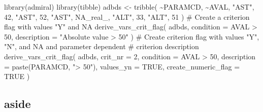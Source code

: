 \documentclass[
]{report}
\newenvironment{Shaded}{\begin{snugshade}}{\end{snugshade}}
\newcommand{\AttributeTok}[1]{\textcolor[rgb]{0.40,0.45,0.13}{#1}}
\newcommand{\CommentTok}[1]{\textcolor[rgb]{0.37,0.37,0.37}{#1}}
\newcommand{\ConstantTok}[1]{\textcolor[rgb]{0.56,0.35,0.01}{#1}}
\newcommand{\DecValTok}[1]{\textcolor[rgb]{0.68,0.00,0.00}{#1}}
\newcommand{\FunctionTok}[1]{\textcolor[rgb]{0.28,0.35,0.67}{#1}}
\newcommand{\NormalTok}[1]{\textcolor[rgb]{0.00,0.23,0.31}{#1}}
\newcommand{\OtherTok}[1]{\textcolor[rgb]{0.00,0.23,0.31}{#1}}
\newcommand{\SpecialCharTok}[1]{\textcolor[rgb]{0.37,0.37,0.37}{#1}}
\newcommand{\StringTok}[1]{\textcolor[rgb]{0.13,0.47,0.30}{#1}}
\begin{document}
\begin{tcolorbox}[enhanced jigsaw, arc=.35mm, bottomrule=.15mm, bottomtitle=1mm, breakable, colback=white, colbacktitle=quarto-callout-tip-color!10!white, colframe=quarto-callout-tip-color-frame, coltitle=black, left=2mm, leftrule=.75mm, opacityback=0, opacitybacktitle=0.6, rightrule=.15mm, title=\textcolor{quarto-callout-tip-color}{\faLightbulb}\hspace{0.5em}{Expand for Full Code Walkthrough}, titlerule=0mm, toprule=.15mm, toptitle=1mm]

\begin{Shaded}
\begin{Highlighting}[]
\FunctionTok{library}\NormalTok{(admiral)}
\FunctionTok{library}\NormalTok{(tibble)}
\NormalTok{adbds }\OtherTok{\textless{}{-}} \FunctionTok{tribble}\NormalTok{(}
  \SpecialCharTok{\textasciitilde{}}\NormalTok{PARAMCD, }\SpecialCharTok{\textasciitilde{}}\NormalTok{AVAL,}
  \StringTok{"AST"}\NormalTok{,    }\DecValTok{42}\NormalTok{,}
  \StringTok{"AST"}\NormalTok{,    }\DecValTok{52}\NormalTok{,}
  \StringTok{"AST"}\NormalTok{,    }\ConstantTok{NA\_real\_}\NormalTok{,}
  \StringTok{"ALT"}\NormalTok{,    }\DecValTok{33}\NormalTok{,}
  \StringTok{"ALT"}\NormalTok{,    }\DecValTok{51}
\NormalTok{)}
\CommentTok{\# Create a criterion flag with values "Y" and NA}
\FunctionTok{derive\_vars\_crit\_flag}\NormalTok{(}
\NormalTok{  adbds,}
  \AttributeTok{condition =}\NormalTok{ AVAL }\SpecialCharTok{\textgreater{}} \DecValTok{50}\NormalTok{,}
  \AttributeTok{description =} \StringTok{"Absolute value \textgreater{} 50"}
\NormalTok{)}
\CommentTok{\# Create criterion flag with values "Y", "N", and NA and parameter dependent}
\CommentTok{\# criterion description}
\FunctionTok{derive\_vars\_crit\_flag}\NormalTok{(}
\NormalTok{  adbds,}
  \AttributeTok{crit\_nr =} \DecValTok{2}\NormalTok{,}
  \AttributeTok{condition =}\NormalTok{ AVAL }\SpecialCharTok{\textgreater{}} \DecValTok{50}\NormalTok{,}
  \AttributeTok{description =} \FunctionTok{paste}\NormalTok{(PARAMCD, }\StringTok{"\textgreater{} 50"}\NormalTok{),}
  \AttributeTok{values\_yn =} \ConstantTok{TRUE}\NormalTok{,}
  \AttributeTok{create\_numeric\_flag =} \ConstantTok{TRUE}
\NormalTok{)}
\end{Highlighting}
\end{Shaded}

\end{tcolorbox}

\subsection{aside}\label{aside}
\end{document}
